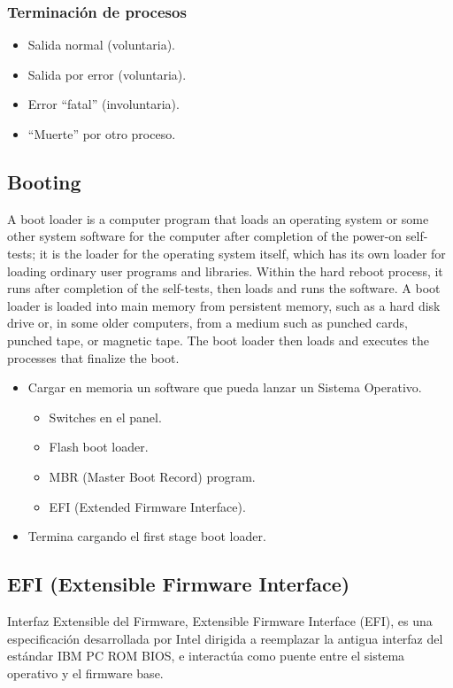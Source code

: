 \documentclass[a4paper, twoside]{article}
\begin{document}
\subsubsection{Terminación de procesos}
\begin{itemize}
	\item Salida normal (voluntaria).
	\item Salida por error (voluntaria).
	\item Error ``fatal'' (involuntaria).
	\item ``Muerte'' por otro proceso.
\end{itemize}

\subsection{Booting}
A boot loader is a computer program that loads an operating system or some other system software for the computer after completion of the power-on self-tests; it is the loader for the operating system itself, which has its own loader for loading ordinary user programs and libraries. Within the hard reboot process, it runs after completion of the self-tests, then loads and runs the software. A boot loader is loaded into main memory from persistent memory, such as a hard disk drive or, in some older computers, from a medium such as punched cards, punched tape, or magnetic tape. The boot loader then loads and executes the processes that finalize the boot.

\begin{itemize}
	\item Cargar en memoria un software que pueda lanzar un Sistema Operativo.
	\begin{itemize}
		\item Switches en el panel.
		\item Flash boot loader.
		\item MBR (Master Boot Record) program.
		\item EFI (Extended Firmware Interface).
	\end{itemize}
	\item Termina cargando el first stage boot loader.
\end{itemize}

\subsection{EFI (Extensible Firmware Interface)}
Interfaz Extensible del Firmware, Extensible Firmware Interface (EFI), es una especificación desarrollada por Intel dirigida a reemplazar la antigua interfaz del estándar IBM PC ROM BIOS, e interactúa como puente entre el sistema operativo y el firmware base.
\end{document}
